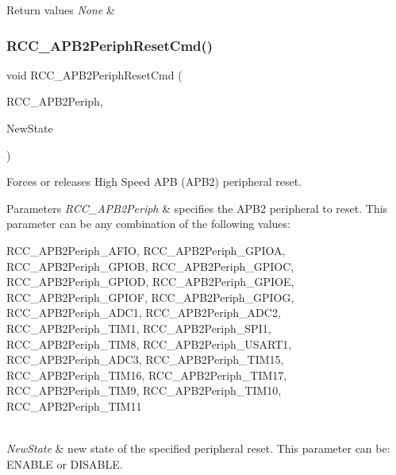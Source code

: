 \begin{DoxyRetVals}{Return values}
{\em None} & \\
\hline
\end{DoxyRetVals}
\mbox{\label{group___r_c_c___private___functions_gad94553850ac07106a27ee85fec37efdf}} 
\subsubsection{\texorpdfstring{RCC\_APB2PeriphResetCmd()}{RCC\_APB2PeriphResetCmd()}}
{\footnotesize\ttfamily void R\+C\+C\+\_\+\+A\+P\+B2\+Periph\+Reset\+Cmd (\begin{DoxyParamCaption}\item[{uint32\+\_\+t}]{R\+C\+C\+\_\+\+A\+P\+B2\+Periph,  }\item[{\mbox{\hyperlink{group___exported__types_gac9a7e9a35d2513ec15c3b537aaa4fba1}{Functional\+State}}}]{New\+State }\end{DoxyParamCaption})}



Forces or releases High Speed A\+PB (A\+P\+B2) peripheral reset. 


\begin{DoxyParams}{Parameters}
{\em R\+C\+C\+\_\+\+A\+P\+B2\+Periph} & specifies the A\+P\+B2 peripheral to reset. This parameter can be any combination of the following values\+: \begin{DoxyItemize}
\item R\+C\+C\+\_\+\+A\+P\+B2\+Periph\+\_\+\+A\+F\+IO, R\+C\+C\+\_\+\+A\+P\+B2\+Periph\+\_\+\+G\+P\+I\+OA, R\+C\+C\+\_\+\+A\+P\+B2\+Periph\+\_\+\+G\+P\+I\+OB, R\+C\+C\+\_\+\+A\+P\+B2\+Periph\+\_\+\+G\+P\+I\+OC, R\+C\+C\+\_\+\+A\+P\+B2\+Periph\+\_\+\+G\+P\+I\+OD, R\+C\+C\+\_\+\+A\+P\+B2\+Periph\+\_\+\+G\+P\+I\+OE, R\+C\+C\+\_\+\+A\+P\+B2\+Periph\+\_\+\+G\+P\+I\+OF, R\+C\+C\+\_\+\+A\+P\+B2\+Periph\+\_\+\+G\+P\+I\+OG, R\+C\+C\+\_\+\+A\+P\+B2\+Periph\+\_\+\+A\+D\+C1, R\+C\+C\+\_\+\+A\+P\+B2\+Periph\+\_\+\+A\+D\+C2, R\+C\+C\+\_\+\+A\+P\+B2\+Periph\+\_\+\+T\+I\+M1, R\+C\+C\+\_\+\+A\+P\+B2\+Periph\+\_\+\+S\+P\+I1, R\+C\+C\+\_\+\+A\+P\+B2\+Periph\+\_\+\+T\+I\+M8, R\+C\+C\+\_\+\+A\+P\+B2\+Periph\+\_\+\+U\+S\+A\+R\+T1, R\+C\+C\+\_\+\+A\+P\+B2\+Periph\+\_\+\+A\+D\+C3, R\+C\+C\+\_\+\+A\+P\+B2\+Periph\+\_\+\+T\+I\+M15, R\+C\+C\+\_\+\+A\+P\+B2\+Periph\+\_\+\+T\+I\+M16, R\+C\+C\+\_\+\+A\+P\+B2\+Periph\+\_\+\+T\+I\+M17, R\+C\+C\+\_\+\+A\+P\+B2\+Periph\+\_\+\+T\+I\+M9, R\+C\+C\+\_\+\+A\+P\+B2\+Periph\+\_\+\+T\+I\+M10, R\+C\+C\+\_\+\+A\+P\+B2\+Periph\+\_\+\+T\+I\+M11\end{DoxyItemize}
\\
\hline
{\em New\+State} & new state of the specified peripheral reset. This parameter can be\+: E\+N\+A\+B\+LE or D\+I\+S\+A\+B\+LE. \\
\hline
\end{DoxyParams}

